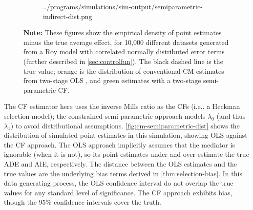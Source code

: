 \begin{figure}[h!]
\begin{subfigure}[c]{0.475\textwidth}
{            ../programs/simulations/sim-output/semiparametric-indirect-dist.png}
    \end{subfigure}
    \label{fig:cm-semiparametric-dist}
    \justify
    \footnotesize    
    \textbf{Note:}
    These figures show the empirical density of point estimates minus the true average effect, for 10,000 different datasets generated from a Roy model with correlated normally distributed error terms (further described in \autoref{sec:controlfun}).
    The black dashed line is the true value;
    orange is the distribution of conventional CM estimates from two-stage OLS \citep{imai2010identification},
    and green estimates with a two-stage semi-parametric CF.
\end{figure}

The CF estimator here uses the inverse Mills ratio as the CFs (i.e., a Heckman selection model); the constrained semi-parametric approach models $\lambda_0$ (and thus $\lambda_1$) to avoid distributional assumptions.
\autoref{fig:cm-semiparametric-dist} shows the distribution of simulated point estimates in this simulation, showing OLS against the CF approach.
The OLS approach implicitly assumes that the mediator is ignorable (when it is not), so its point estimates under and over-estimate the true ADE and AIE, respectively.
The distance between the OLS estimates and the true values are the underlying bias terms derived in \autoref{thm:selection-bias}.
In this data generating process, the OLS confidence interval do not overlap the true values for any standard level of significance.
The CF approach exhibits bias, though the 95\% confidence intervals cover the truth.

